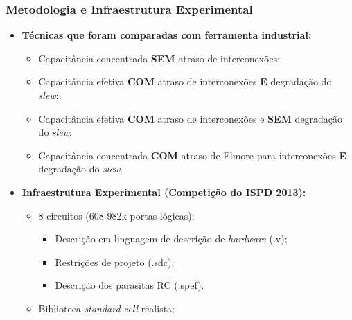 \documentclass[10pt,a4paper]{beamer}
\begin{document}
		\begin{frame}[t]
			\frametitle{Metodologia e Infraestrutura Experimental}
				\begin{itemize}
					\item \textbf{Técnicas que foram comparadas com ferramenta industrial:}	\\
						\begin{itemize}
							\item Capacitância concentrada \textbf{SEM} atraso de interconexões;
							\item Capacitância efetiva \textbf{COM} atraso de interconexões \textbf{E} degradação do \textit{slew};								\item Capacitância efetiva \textbf{COM} atraso de interconexões e \textbf{SEM} degradação do \textit{slew};
							\item Capacitância concentrada \textbf{COM} atraso de Elmore para interconexões \textbf{E} degradação do \textit{slew}.
							
						\end{itemize} \pause
					\item \textbf{Infraestrutura Experimental (Competição do ISPD 2013): } \\
						\begin{itemize}
						\item 8 circuitos (608-982k portas lógicas): \\
						\begin{itemize}
							\item Descrição em linguagem de descrição de \textit{hardware} (.v); \\
							\item Restrições de projeto (.sdc);\\
							\item Descrição dos parasitas RC (.spef).
						\end{itemize}
						\item Biblioteca \textit{standard cell} realista; \\
					\end{itemize} 
				\end{itemize}
				
		\end{frame}			
		
\end{document}
